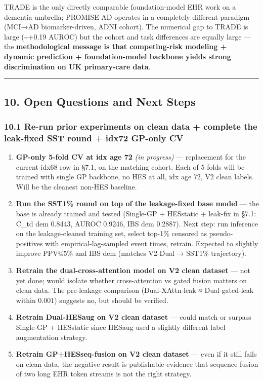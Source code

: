 \documentclass[
  11pt,
]{article}
\providecommand{\tightlist}{%
  \setlength{\itemsep}{0pt}\setlength{\parskip}{0pt}}
\begin{document}
TRADE is the only directly comparable foundation-model EHR work on a
dementia umbrella; PROMISE-AD operates in a completely different
paradigm (MCI→AD biomarker-driven, ADNI cohort). The numerical gap to
TRADE is large (\textasciitilde+0.19 AUROC) but the cohort and task
differences are equally large --- the \textbf{methodological message is
that competing-risk modeling + dynamic prediction + foundation-model
backbone yields strong discrimination on UK primary-care data}.

\begin{center}\rule{0.5\linewidth}{0.5pt}\end{center}

\subsection{10. Open Questions and Next
Steps}\label{open-questions-and-next-steps}

\subsubsection{10.1 Re-run prior experiments on clean data + complete
the leak-fixed SST round + idx72 GP-only
CV}\label{re-run-prior-experiments-on-clean-data-complete-the-leak-fixed-sst-round-idx72-gp-only-cv}

\begin{enumerate}
\def\labelenumi{\arabic{enumi}.}
\tightlist
\item
  \textbf{GP-only 5-fold CV at idx age 72} \emph{(in progress)} ---
  replacement for the current idx68 row in §7.1, on the matching cohort.
  Each of 5 folds will be trained with single GP backbone, no HES at
  all, idx age 72, V2 clean labels. Will be the cleanest non-HES
  baseline.
\item
  \textbf{Run the SST1\% round on top of the leakage-fixed base model}
  --- the base is already trained and tested (Single-GP + HESstatic +
  leak-fix in §7.1: C\_td dem 0.8443, AUROC 0.9246, IBS dem 0.2887).
  Next step: run inference on the leakage-cleaned training set, select
  top-1\% censored as pseudo-positives with empirical-lag-sampled event
  times, retrain. Expected to slightly improve PPV@5\% and IBS dem
  (matches V2-Dual → SST1\% trajectory).
\item
  \textbf{Retrain the dual-cross-attention model on V2 clean dataset}
  --- not yet done; would isolate whether cross-attention vs gated
  fusion matters on clean data. The pre-leakage comparison
  (Dual-XAttn-leak ≈ Dual-gated-leak within 0.001) suggests no, but
  should be verified.
\item
  \textbf{Retrain Dual-HESaug on V2 clean dataset} --- could match or
  surpass Single-GP + HESstatic since HESaug used a slightly different
  label augmentation strategy.
\item
  \textbf{Retrain GP+HESseq-fusion on V2 clean dataset} --- even if it
  still fails on clean data, the negative result is publishable evidence
  that sequence fusion of two long EHR token streams is not the right
  strategy.
\end{enumerate}
\end{document}

